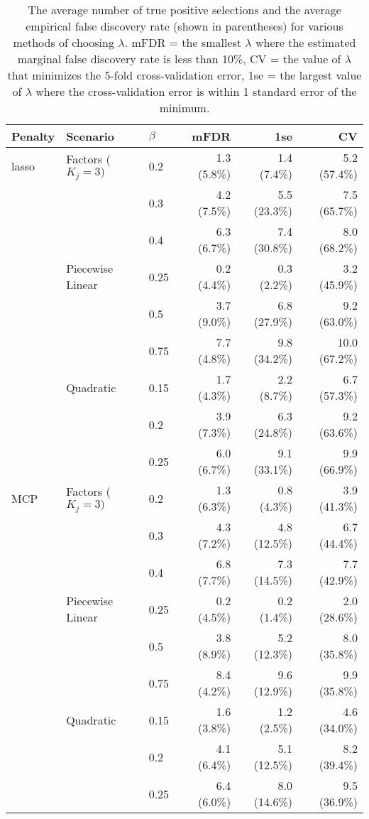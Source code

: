 \begin{table}[htb!]
\centering
\caption{\label{Tab:cross-val} The average number of true positive selections and the average empirical false discovery rate (shown in parentheses) for various methods of choosing $\lambda$. mFDR = the smallest $\lambda$ where the estimated marginal false discovery rate is less than 10\%, CV = the value of $\lambda$ that minimizes the 5-fold cross-validation error, 1se = the largest value of $\lambda$ where the cross-validation error is within 1 standard error of the minimum. }
\vspace{.2cm}
\begin{tabular}{l l l r r r}
\hline
Penalty & Scenario & $\beta$ & mFDR & 1se & CV \\
\hline
lasso & Factors ($K_j = 3)$ & 0.2 & 1.3 (5.8\%) & 1.4 (7.4\%) & 5.2 (57.4\%) \\
& & 0.3 & 4.2 (7.5\%) & 5.5 (23.3\%) & 7.5 (65.7\%) \\
& & 0.4 & 6.3 (6.7\%) & 7.4 (30.8\%) & 8.0 (68.2\%) \\
\hline
& Piecewise Linear & 0.25 & 0.2 (4.4\%) & 0.3 (2.2\%) & 3.2 (45.9\%) \\
& & 0.5 & 3.7 (9.0\%) & 6.8 (27.9\%) & 9.2 (63.0\%) \\
& & 0.75 & 7.7 (4.8\%) & 9.8 (34.2\%) & 10.0 (67.2\%) \\
\hline
& Quadratic & 0.15 & 1.7 (4.3\%) & 2.2 (8.7\%) & 6.7 (57.3\%) \\
& & 0.2 & 3.9 (7.3\%) & 6.3 (24.8\%) & 9.2 (63.6\%) \\
& & 0.25 & 6.0 (6.7\%) & 9.1 (33.1\%) & 9.9 (66.9\%) \\
\hline
MCP & Factors ($K_j = 3)$ & 0.2 & 1.3 (6.3\%) & 0.8 (4.3\%) & 3.9 (41.3\%) \\
& & 0.3 & 4.3 (7.2\%) & 4.8 (12.5\%) & 6.7 (44.4\%) \\
& & 0.4 & \ 6.8 (7.7\%) & 7.3 (14.5\%) & 7.7 (42.9\%) \\
\hline
& Piecewise Linear & 0.25 & 0.2 (4.5\%) & 0.2 (1.4\%) & 2.0 (28.6\%) \\
& & 0.5 & 3.8 (8.9\%) & 5.2 (12.3\%) & 8.0 (35.8\%) \\
& & 0.75 & 8.4 (4.2\%) & 9.6 (12.9\%) & 9.9 (35.8\%) \\
\hline
& Quadratic & 0.15 & 1.6 (3.8\%) & 1.2 (2.5\%) & 4.6 (34.0\%) \\
& & 0.2 & 4.1 (6.4\%) & 5.1 (12.5\%) & 8.2 (39.4\%) \\
& & 0.25 & 6.4 (6.0\%) & 8.0 (14.6\%) & 9.5 (36.9\%) \\
\hline
\end{tabular}
\end{table}

